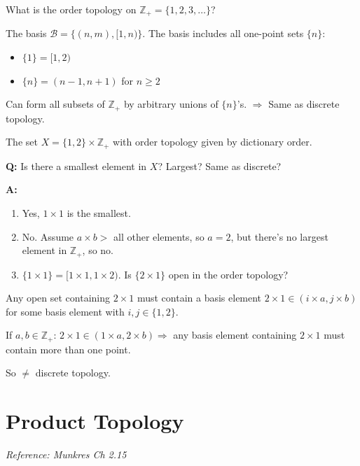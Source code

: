 \documentclass[11pt]{report}
\begin{document}
\begin{exbox}
What is the order topology on $\mathbb{Z}_+ = \{1, 2, 3, \ldots\}$?

The basis $\mathcal{B} = \{(n, m), [1, n)\}$. The basis includes all one-point sets $\{n\}$:
\begin{itemize}
    \item $\{1\} = [1, 2)$
    \item $\{n\} = (n-1, n+1)$ for $n \geq 2$
\end{itemize}
Can form all subsets of $\mathbb{Z}_+$ by arbitrary unions of $\{n\}$'s. $\Rightarrow$ Same as discrete topology.
\end{exbox}

\begin{exbox}
The set $X = \{1, 2\} \times \mathbb{Z}_+$ with order topology given by dictionary order.

\textbf{Q:} Is there a smallest element in $X$? Largest? Same as discrete?

\textbf{A:} 
\begin{enumerate}
    \item Yes, $1 \times 1$ is the smallest.
    \item No. Assume $a \times b >$ all other elements, so $a = 2$, but there's no largest element in $\mathbb{Z}_+$, so no.
    \item $\{1 \times 1\} = [1 \times 1, 1 \times 2)$. Is $\{2 \times 1\}$ open in the order topology?
\end{enumerate}

Any open set containing $2 \times 1$ must contain a basis element $2 \times 1 \in (i \times a, j \times b)$ for some basis element with $i, j \in \{1, 2\}$.

If $a, b \in \mathbb{Z}_+$: $2 \times 1 \in (1 \times a, 2 \times b) \Rightarrow$ any basis element containing $2 \times 1$ must contain more than one point.

So $\neq$ discrete topology.
\end{exbox}

\section{Product Topology}

\textit{Reference: Munkres Ch 2.15}
\end{document}
